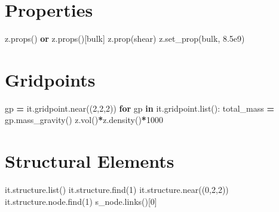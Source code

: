 \documentclass[a4paper, nobind]{templates/ociamthesis}
\newenvironment{Shaded}{\begin{snugshade}}{\end{snugshade}}
\newcommand{\BuiltInTok}[1]{#1}
\newcommand{\ControlFlowTok}[1]{\textcolor[rgb]{0.13,0.29,0.53}{\textbf{#1}}}
\newcommand{\DecValTok}[1]{\textcolor[rgb]{0.00,0.00,0.81}{#1}}
\newcommand{\FloatTok}[1]{\textcolor[rgb]{0.00,0.00,0.81}{#1}}
\newcommand{\KeywordTok}[1]{\textcolor[rgb]{0.13,0.29,0.53}{\textbf{#1}}}
\newcommand{\NormalTok}[1]{#1}
\newcommand{\OperatorTok}[1]{\textcolor[rgb]{0.81,0.36,0.00}{\textbf{#1}}}
\newcommand{\StringTok}[1]{\textcolor[rgb]{0.31,0.60,0.02}{#1}}
\renewenvironment{Shaded}
{
  \vspace{10pt}%
  \begin{snugshade}%
}{%
  \end{snugshade}%
  \vspace{8pt}%
}
\begin{document}
\hypertarget{properties-2}{%
\section{Properties}\label{properties-2}}

\begin{Shaded}
\begin{Highlighting}[]
\NormalTok{z.props() }\KeywordTok{or}\NormalTok{ z.props()[}\StringTok{\textquotesingle{}bulk\textquotesingle{}}\NormalTok{]}
\NormalTok{z.prop(}\StringTok{\textquotesingle{}shear\textquotesingle{}}\NormalTok{)}
\NormalTok{z.set\_prop(}\StringTok{\textquotesingle{}bulk\textquotesingle{}}\NormalTok{, }\FloatTok{8.5e9}\NormalTok{)}
\end{Highlighting}
\end{Shaded}

\hypertarget{gridpoints}{%
\section{Gridpoints}\label{gridpoints}}

\begin{Shaded}
\begin{Highlighting}[]
\NormalTok{gp }\OperatorTok{=}\NormalTok{ it.gridpoint.near((}\DecValTok{2}\NormalTok{,}\DecValTok{2}\NormalTok{,}\DecValTok{2}\NormalTok{))}
\ControlFlowTok{for}\NormalTok{ gp }\KeywordTok{in}\NormalTok{ it.gridpoint.}\BuiltInTok{list}\NormalTok{():}
\NormalTok{  total\_mass }\OperatorTok{=}\NormalTok{ gp.mass\_gravity()}
\NormalTok{z.vol()}\OperatorTok{*}\NormalTok{z.density()}\OperatorTok{*}\DecValTok{1000}
\end{Highlighting}
\end{Shaded}

\hypertarget{structural-elements}{%
\section{Structural Elements}\label{structural-elements}}

\begin{Shaded}
\begin{Highlighting}[]
\NormalTok{it.structure.}\BuiltInTok{list}\NormalTok{()}
\NormalTok{it.structure.find(}\DecValTok{1}\NormalTok{)}
\NormalTok{it.structure.near((}\DecValTok{0}\NormalTok{,}\DecValTok{2}\NormalTok{,}\DecValTok{2}\NormalTok{))}
\NormalTok{it.structure.node.find(}\DecValTok{1}\NormalTok{)}
\NormalTok{s\_node.links()[}\DecValTok{0}\NormalTok{]}
\end{Highlighting}
\end{Shaded}
\end{document}
